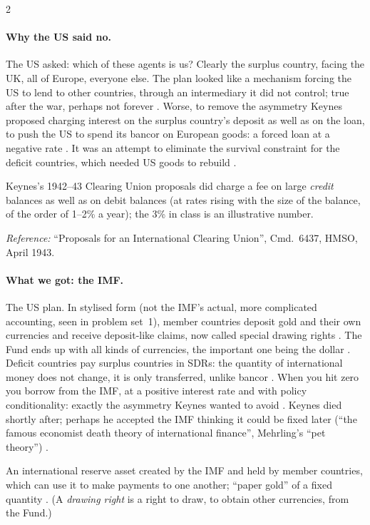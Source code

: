 \begin{paracol}{2}
\paragraph{Why the US said no.} The US asked: which of these agents is us? Clearly the surplus country, facing the UK, all of Europe, everyone else. The plan looked
like a mechanism forcing the US to lend to other countries, through an intermediary it did not control; true after the war, perhaps not forever
. Worse, to remove the asymmetry Keynes proposed charging interest on the surplus country's deposit as
well as on the loan, to push the US to spend its bancor on European goods: a forced loan at a negative rate .
It was an attempt to eliminate the survival constraint for the deficit countries, which needed US goods to rebuild .

\begin{coursenote}
Keynes's 1942--43 Clearing Union proposals did charge a fee on large \emph{credit} balances as well as on debit balances (at rates rising with the size of the
balance, of the order of 1--2\% a year); the 3\% in class is an illustrative number.\par
\emph{Reference:} ``Proposals for an International Clearing Union'', Cmd.~6437, HMSO, April 1943.
\end{coursenote}

\paragraph{What we got: the IMF.} The US plan. In stylised form (not the IMF's actual, more complicated accounting, seen in problem set~1), member countries
deposit gold and their own currencies and receive deposit-like claims, now called special drawing rights .
The Fund ends up with all kinds of currencies, the important one being the dollar . Deficit countries pay surplus countries in
SDRs: the quantity of international money does not change, it is only transferred, unlike bancor . When you hit zero you
borrow from the IMF, at a positive interest rate and with policy conditionality: exactly the asymmetry Keynes wanted to avoid .
Keynes died shortly after; perhaps he accepted the IMF thinking it could be fixed later (``the famous economist death theory of international finance'',
Mehrling's ``pet theory'') .

\begin{definition}
An international reserve asset created by the IMF and held by member countries, which can use it to make payments to one another; ``paper gold'' of a fixed
quantity . (A \emph{drawing right} is a right to draw, to obtain other currencies, from the Fund.)
\end{definition}


\end{paracol}
